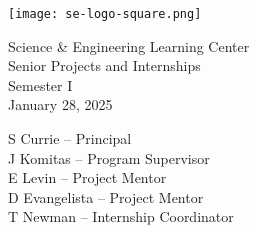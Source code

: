 \vspace*{\fill}
\begin{center}
\texttt{[image: se-logo-square.png]}
\end{center}
\vspace{1em}
\begin{center}
\large{Science \& Engineering Learning Center}\\
Senior Projects and Internships\\
Semester I\\
January 28, 2025
\end{center}
\vfill
\begin{center}
\large{
S Currie -- Principal\\
J Komitas -- Program Supervisor\\
E Levin -- Project Mentor\\
D Evangelista -- Project Mentor\\
T Newman -- Internship Coordinator}
\end{center}
\vspace*{\fill}
